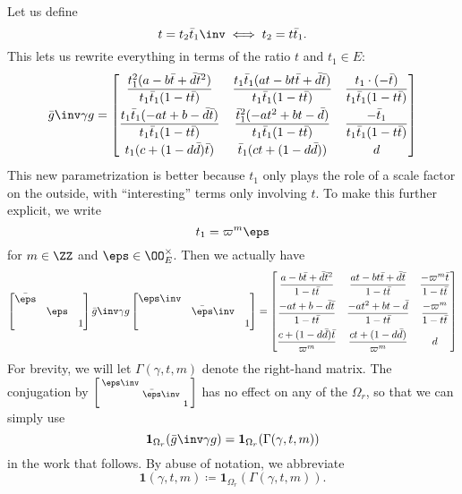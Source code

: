 Let us define \[ t = t_2 \bar t_1 \inv \iff t_2 = t \bar t_1. \]
This lets us rewrite everything in terms of the ratio $t$ and $t_1 \in E$:
\[
  \bar g \inv \gamma g
  =
  \begin{bmatrix}
    \dfrac{t_1^2(a-b\bar t+\bar d \bar t^2)}{t_1 \bar t_1(1-t \bar t)}
    & \dfrac{t_1 \bar t_1(at-bt\bar t+\bar d \bar t)}{t_1 \bar t_1(1-t \bar t)}
    & \dfrac{t_1 \cdot (-\bar t)}{t_1 \bar t_1 (1-t \bar t)} \\[2ex]
    \dfrac{t_1\bar t_1(-at+b-\bar d \bar t)}{t_1 \bar t_1(1-t \bar t)}
    & \dfrac{\bar t_1^2(-at^2+bt-\bar d)}{t_1 \bar t_1(1-t \bar t)}
    & \dfrac{-\bar t_1}{t_1 \bar t_1(1-t \bar t)} \\[2ex]
    t_1(c + (1-d\bar d)\bar t) & \bar t_1(ct + (1-d \bar d)) & d
  \end{bmatrix}
\]
This new parametrization is better because $t_1$ only plays the role of
a scale factor on the outside, with ``interesting'' terms only involving $t$.
To make this further explicit, we write
\[ t_1 = \varpi^m \eps \]
for $m \in \ZZ$ and $\eps \in \OO_E^\times$.
Then we actually have
\[
  \begin{bmatrix} \bar\eps \\ & \eps \\ & & 1 \end{bmatrix}
  \bar g \inv \gamma g
  \begin{bmatrix} \eps\inv \\ & \bar\eps\inv \\ & & 1 \end{bmatrix}
  =
  \begin{bmatrix}
    \dfrac{a-b\bar t+\bar d \bar t^2}{1-t \bar t}
    & \dfrac{at-bt\bar t+\bar d \bar t}{1-t \bar t}
    & \dfrac{-\varpi^m \bar t}{1-t \bar t} \\[2ex]
    \dfrac{-at+b-\bar d \bar t}{1-t \bar t}
    & \dfrac{-at^2+bt-\bar d}{1-t \bar t}
    & \dfrac{-\varpi^m}{1-t \bar t} \\[2ex]
    \dfrac{c + (1-d\bar d)\bar t}{\varpi^m} & \dfrac{ct + (1-d \bar d)}{\varpi^m} & d
  \end{bmatrix}
\]
For brevity, we will let $\Gamma(\gamma, t, m)$ denote the right-hand matrix.
The conjugation by
$\left[ \begin{smallmatrix} \eps\inv \\ & \bar\eps\inv \\ & & 1 \end{smallmatrix} \right]$
has no effect on any of the $\Omega_r$, so that we can simply use
\[ \mathbf{1}_{\Omega_r}(\bar g \inv \gamma g) = \mathbf{1}_{\Omega_r}(\Gamma(\gamma, t, m)) \]
in the work that follows.
By abuse of notation, we abbreviate
\[ \mathbf{1}(\gamma, t, m) \coloneqq \mathbf{1}_{\Omega_r}(\Gamma(\gamma, t, m)). \]


